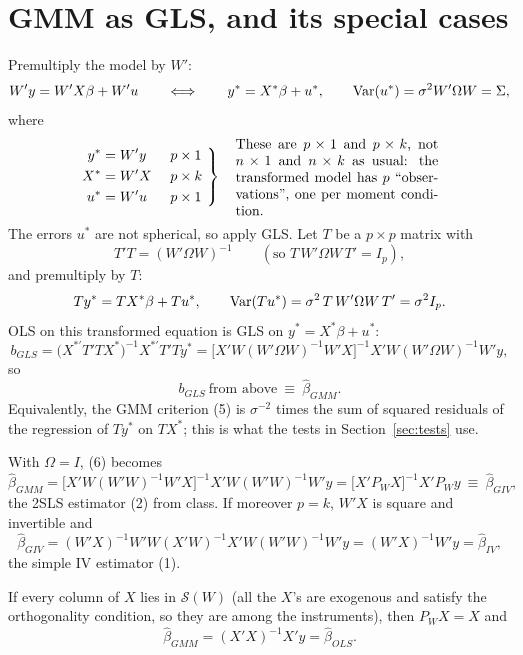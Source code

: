 \documentclass[11pt]{article}
\begin{document}
\section{GMM as GLS, and its special cases}

Premultiply the model by $W'$:
\[ W'y=W'X\beta+W'u
   \qquad\Longleftrightarrow\qquad
   y^{*}=X^{*}\beta+u^{*},\qquad \operatorname{Var}(u^{*})=\sigma^{2}W'\Omega W=\Sigma, \]
where
\[ \left.\begin{aligned}
 y^{*}&=W'y &&\ p\times1\\
 X^{*}&=W'X &&\ p\times k\\
 u^{*}&=W'u &&\ p\times1
\end{aligned}\ \right\}\quad
\begin{minipage}{0.42\textwidth}
These are $p\times1$ and $p\times k$, not $n\times1$ and $n\times k$ as usual: the transformed model has
$p$ ``observations'', one per moment condition.
\end{minipage} \]
The errors $u^{*}$ are not spherical, so apply GLS. Let $T$ be a $p\times p$ matrix with
\[ T'T=(W'\Omega W)^{-1}\qquad(\text{so }T\,W'\Omega W\,T'=I_{p}), \]
and premultiply by $T$:
\[ Ty^{*}=TX^{*}\beta+Tu^{*},\qquad \operatorname{Var}(Tu^{*})=\sigma^{2}\,T\,W'\Omega W\,T'=\sigma^{2}I_{p}. \]
OLS on this transformed equation is GLS on $y^{*}=X^{*}\beta+u^{*}$:
\[ b_{GLS}=\bigl(X^{*\prime}T'TX^{*}\bigr)^{-1}X^{*\prime}T'Ty^{*}
         =\bigl[X'W(W'\Omega W)^{-1}W'X\bigr]^{-1}X'W(W'\Omega W)^{-1}W'y , \]
so
\[ b_{GLS}\ \text{from above}\ \equiv\ \hat\beta_{GMM}. \]
Equivalently, the GMM criterion (5) is $\sigma^{-2}$ times the sum of squared residuals of the regression of
$Ty^{*}$ on $TX^{*}$; this is what the tests in Section~\ref{sec:tests} use.

With $\Omega=I$, (6) becomes
\[ \hat\beta_{GMM}=\bigl[X'W(W'W)^{-1}W'X\bigr]^{-1}X'W(W'W)^{-1}W'y
   =\bigl[X'P_{W}X\bigr]^{-1}X'P_{W}y\ \equiv\ \hat\beta_{GIV}, \]
the 2SLS estimator (2) from class. If moreover $p=k$, $W'X$ is square and invertible and
\[ \hat\beta_{GIV}=(W'X)^{-1}W'W(X'W)^{-1}X'W(W'W)^{-1}W'y=(W'X)^{-1}W'y=\hat\beta_{IV}, \]
the simple IV estimator (1).

If every column of $X$ lies in $\mathcal S(W)$ (all the $X$'s are exogenous and satisfy the orthogonality
condition, so they are among the instruments), then $P_{W}X=X$ and
\[ \hat\beta_{GMM}=(X'X)^{-1}X'y=\hat\beta_{OLS}. \]
\end{document}
